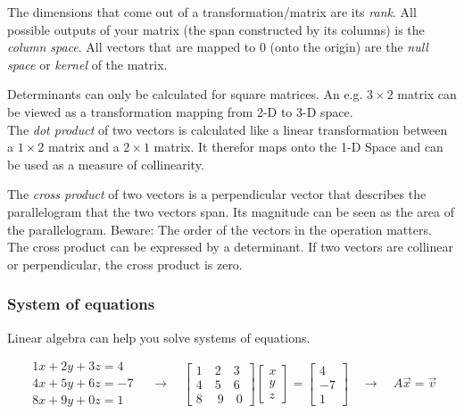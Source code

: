 \documentclass[
]{book}
\begin{document}
The dimensions that come out of a transformation/matrix are its \emph{rank}.
All possible outputs of your matrix (the span constructed by its
columns) is the \emph{column space}. All vectors that are mapped to 0 (onto
the origin) are the \emph{null space} or \emph{kernel} of the matrix.

Determinants can only be calculated for square matrices. An e.g.
\(3 \times 2\) matrix can be viewed as a transformation mapping from 2-D
to 3-D space.\\

The \emph{dot product} of two vectors is calculated like a linear
transformation between a \(1 \times 2\) matrix and a \(2 \times 1\) matrix.
It therefor maps onto the 1-D Space and can be used as a measure of
collinearity.

The \emph{cross product} of two vectors is a perpendicular vector that
describes the parallelogram that the two vectors span. Its magnitude can
be seen as the area of the parallelogram. Beware: The order of the
vectors in the operation matters. The cross product can be expressed by
a determinant. If two vectors are collinear or perpendicular, the cross
product is zero.

\hypertarget{system-of-equations}{%
\subsubsection{System of equations}\label{system-of-equations}}

Linear algebra can help you solve systems of equations.

\[
\begin{array}{ll} 1x+2y+3z=4 \\ 4x+5y+6z=-7 \\8x + 9y +0z = 1 \end{array}
\quad  \rightarrow  \quad
\begin{bmatrix} 1 \quad 2 \quad 3 \\ 4 \quad 5 \quad 6 \\ 8 \quad \ 9 \quad 0 \end{bmatrix} 
\begin{bmatrix} x \\ y \\ z\end{bmatrix} = 
\begin{bmatrix} 4 \\ -7 \\ 1 \end{bmatrix} 
\quad \rightarrow \quad
A \vec{x} = \vec{v}
\]
\end{document}
